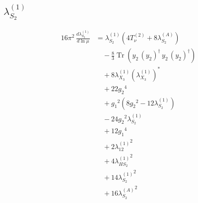 \documentclass[10pt,a4paper]{article}
\begin{document}
\subsection*{$\lambda_{S_2}^{(1)}$}
\begin{align*}
16\pi^2\,\frac{d \lambda_{S_2}^{(1)}}{d\ln\mu} &={\lambda_{S_2}^{(1)}} (4 T_{\nu}^{(2)}+8 {\lambda_{S_2}^{(A)}}) \\
&\quad -\frac{8}{3} \operatorname{Tr}\!\left({y_2}\,\left({y_2}\right)^{\dagger}\,{y_2}\,\left({y_2}\right)^{\dagger}\right) \\
&\quad +8 {\lambda_{X_{3}}^{(1)}} \left({\lambda_{X_{3}}^{(1)}}\right)^{*} \\
&\quad +22 {g_2}^4 \\
&\quad +{g_1}^2 \left(8 {g_2}^2-12 {\lambda_{S_2}^{(1)}}\right) \\
&\quad -24 {g_2}^2 {\lambda_{S_2}^{(1)}} \\
&\quad +12 {g_1}^4 \\
&\quad +2 {\lambda_{12}^{(1)}}^2 \\
&\quad +4 {\lambda_{HS_2}^{(1)}}^2 \\
&\quad +14 {\lambda_{S_2}^{(1)}}^2 \\
&\quad +16 {\lambda_{S_2}^{(A)}}^2 \\
\end{align*}
\end{document}
